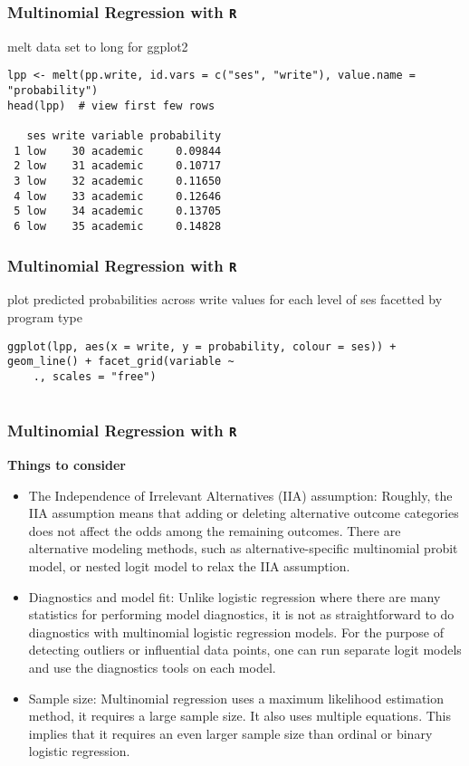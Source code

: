 \documentclass[00-GLMregslides.tex]{subfiles}
\begin{document}
\begin{frame}[fragile]

\frametitle{Multinomial Regression with \texttt{R}}
\Large
 melt data set to long for ggplot2
\begin{verbatim}
lpp <- melt(pp.write, id.vars = c("ses", "write"), value.name = "probability")
head(lpp)  # view first few rows
 
   ses write variable probability
 1 low    30 academic     0.09844
 2 low    31 academic     0.10717
 3 low    32 academic     0.11650
 4 low    33 academic     0.12646
 5 low    34 academic     0.13705
 6 low    35 academic     0.14828
\end{verbatim}
\end{frame}
\begin{frame}[fragile]

\frametitle{Multinomial Regression with \texttt{R}}
\Large 
 plot predicted probabilities across write values for each level of ses
 facetted by program type
\begin{verbatim}
ggplot(lpp, aes(x = write, y = probability, colour = ses)) + geom_line() + facet_grid(variable ~
    ., scales = "free")
 
\end{verbatim}
\end{frame}
\begin{frame}[fragile]

\frametitle{Multinomial Regression with \texttt{R}}
\Large
\textbf{Things to consider}
\begin{itemize}
\item The Independence of Irrelevant Alternatives (IIA) assumption: Roughly, the IIA assumption means that adding or deleting alternative outcome categories does not affect the odds among the remaining outcomes. There are alternative modeling methods, such as alternative-specific multinomial probit model, or nested logit model to relax the IIA assumption.
\item Diagnostics and model fit: Unlike logistic regression where there are many statistics for performing model diagnostics, it is not as straightforward to do diagnostics with multinomial logistic regression models. For the purpose of detecting outliers or influential data points, one can run separate logit models and use the diagnostics tools on each model. 
\item Sample size: Multinomial regression uses a maximum likelihood estimation method, it requires a large sample size. It also uses multiple equations. This implies that it requires an even larger sample size than ordinal or binary logistic regression.
\end{itemize}

\end{frame}
\end{document}
